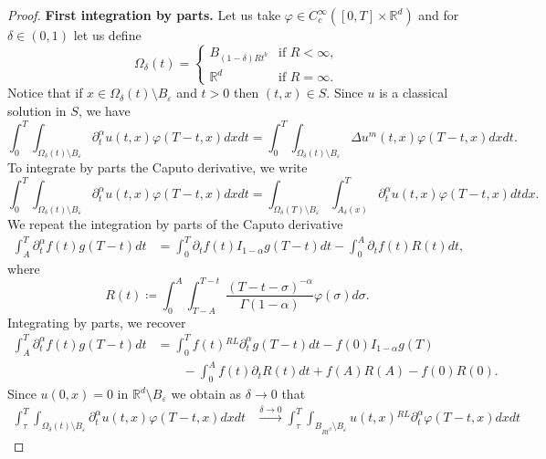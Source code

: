 \documentclass[a4paper]{article}
\theoremstyle{definition}
\newcommand{\Rd}{{\mathbb{R}^d}}
\newcommand{\dRL}{{^{RL}\partial_t^\alpha}}
\begin{document}
\begin{proof}
  \textbf{First integration by parts.}
  Let us take $\varphi \in C_c^\infty([0,T] \times \mathbb R^d)$ and for $\delta \in (0,1)$ let us define
  \[
    \Omega_\delta(t) =
    \begin{cases}
      B_{(1-\delta)Rt^b} & \text{if } R < \infty , \\
      \mathbb R^d        & \text{if } R = \infty.
    \end{cases}
  \]
  Notice that if $x \in \Omega_\delta(t) \setminus B_\varepsilon $ and $t > 0$ then $(t,x) \in S$.
  Since $u$ is a classical solution in $S$, we have
  \begin{equation*}
    \int_{0}^T \int_{\Omega_\delta(t) \setminus B_\varepsilon} \partial_t^\alpha u(t,x)  \varphi (T-t,x)dxdt
    =
    \int_0^{T} \int_{\Omega_\delta(t) \setminus B_\varepsilon} \Delta u^{m} (t,x) \varphi (T- t,x) dxdt.
  \end{equation*}
  To integrate by parts the Caputo derivative, we write
  \begin{equation*}
    \int_{0}^T \int_{\Omega_\delta(t) \setminus B_\varepsilon} \partial_t^\alpha u(t,x)  \varphi (T-t,x)dxdt
    = \int_{\Omega_\delta(T) \setminus B_\varepsilon} \int_{A_\delta(x)}^T \partial_t^\alpha u(t,x)  \varphi (T-t,x)dtdx.
  \end{equation*}
  We repeat the integration by parts of the Caputo derivative
  \begin{align*}
    \int_A^T \partial_t^\alpha f(t) g(T-t) dt & = \int_0^T \partial_t f(t) I_{1-\alpha} g (T-t) dt - \int_0^A \partial_t f (t) R(t) dt,
  \end{align*}
  where
  \[
    R(t) \coloneqq \int_0^A \int_{T-A}^{T-t} \frac{(T-t-\sigma)^{-\alpha}}{\Gamma(1-\alpha)} \varphi(\sigma) d \sigma.
  \]
  Integrating by parts, we recover
  \begin{align*}
    \int_A^T \partial_t^\alpha f(t) g(T-t) dt
    & = \int_0^T  f(t) \dRL g (T-t) dt  - f(0) I_{1-\alpha} g(T)          \\
    & \qquad - \int_0^A f (t) \partial_t R(t) dt + f(A) R(A) - f(0) R(0).
  \end{align*}
  Since $u(0,x)= 0$ in $\Rd \setminus B_\varepsilon$ we obtain as $\delta \to 0$ that
  \begin{align*}
    \int_{\tau}^T \int_{\Omega_\delta(t) \setminus B_\varepsilon} \partial_t^\alpha u(t,x)  \varphi (T-t,x)dxdt
    & \overset{\delta \to 0}\longrightarrow
    \int_{\tau}^T \int_{B_{Rt^\beta} \setminus B_\varepsilon} u(t,x) \dRL \varphi (T-t,x)dxdt

\end{align*}
\end{proof}
\end{document}
